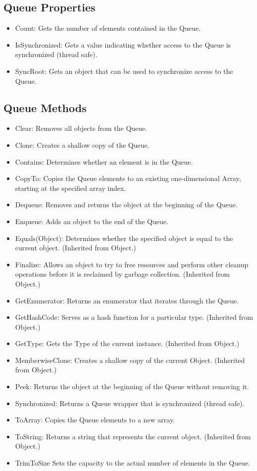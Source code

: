\documentclass[12pt,a4paper,final,twoside,titlepage]{book}
\begin{document}
\subsection{Queue Properties}
\begin{itemize}
\item Count: Gets the number of elements contained in the Queue.
\item IsSynchronized: Gets a value indicating whether access to the Queue is synchronized (thread safe).
\item SyncRoot: Gets an object that can be used to synchronize access to the Queue.
\end{itemize}
\subsection{Queue Methods}
\begin{itemize}
\item Clear: Removes all objects from the Queue.
\item Clone: Creates a shallow copy of the Queue.
\item Contains: Determines whether an element is in the Queue.
\item CopyTo: Copies the Queue elements to an existing one-dimensional Array, starting at the specified array index.
\item Dequeue: Removes and returns the object at the beginning of the Queue.
\item Enqueue: Adds an object to the end of the Queue.
\item Equals(Object): Determines whether the specified object is equal to the current object. (Inherited from Object.)
\item Finalize: Allows an object to try to free resources and perform other cleanup operations before it is reclaimed by garbage collection. (Inherited from Object.)
\item GetEnumerator: Returns an enumerator that iterates through the Queue.
\item GetHashCode: Serves as a hash function for a particular type. (Inherited from Object.)
\item GetType: Gets the Type of the current instance. (Inherited from Object.)
\item MemberwiseClone: Creates a shallow copy of the current Object. (Inherited from Object.)
\item Peek: Returns the object at the beginning of the Queue without removing it.
\item Synchronized: Returns a Queue wrapper that is synchronized (thread safe).
\item ToArray: Copies the Queue elements to a new array.
\item ToString: Returns a string that represents the current object. (Inherited from Object.)
\item TrimToSize	Sets the capacity to the actual number of elements in the Queue.
\end{itemize}
\end{document}
